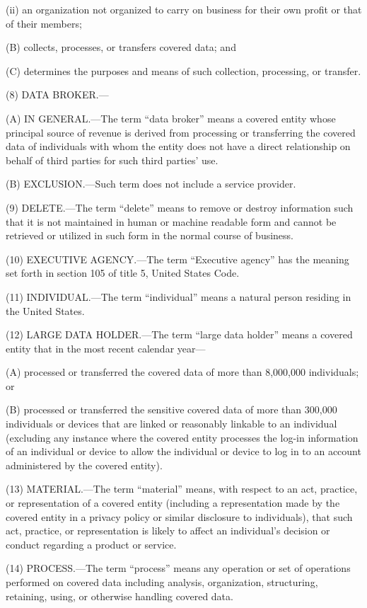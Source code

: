 (ii) an organization not organized to carry on business for their own profit or that of their members;

(B) collects, processes, or transfers covered data; and

(C) determines the purposes and means of such collection, processing, or transfer.

(8) DATA BROKER.—

(A) IN GENERAL.—The term “data broker” means a covered entity whose principal source of revenue is derived from processing or transferring the covered data of individuals with whom the entity does not have a direct relationship on behalf of third parties for such third parties' use.

(B) EXCLUSION.—Such term does not include a service provider.

(9) DELETE.—The term “delete” means to remove or destroy information such that it is not maintained in human or machine readable form and cannot be retrieved or utilized in such form in the normal course of business.

(10) EXECUTIVE AGENCY.—The term “Executive agency” has the meaning set forth in section 105 of title 5, United States Code.

(11) INDIVIDUAL.—The term “individual” means a natural person residing in the United States.

(12) LARGE DATA HOLDER.—The term “large data holder” means a covered entity that in the most recent calendar year—

(A) processed or transferred the covered data of more than 8,000,000 individuals; or

(B) processed or transferred the sensitive covered data of more than 300,000 individuals or devices that are linked or reasonably linkable to an individual (excluding any instance where the covered entity processes the log-in information of an individual or device to allow the individual or device to log in to an account administered by the covered entity).

(13) MATERIAL.—The term “material” means, with respect to an act, practice, or representation of a covered entity (including a representation made by the covered entity in a privacy policy or similar disclosure to individuals), that such act, practice, or representation is likely to affect an individual's decision or conduct regarding a product or service.

(14) PROCESS.—The term “process” means any operation or set of operations performed on covered data including analysis, organization, structuring, retaining, using, or otherwise handling covered data.

